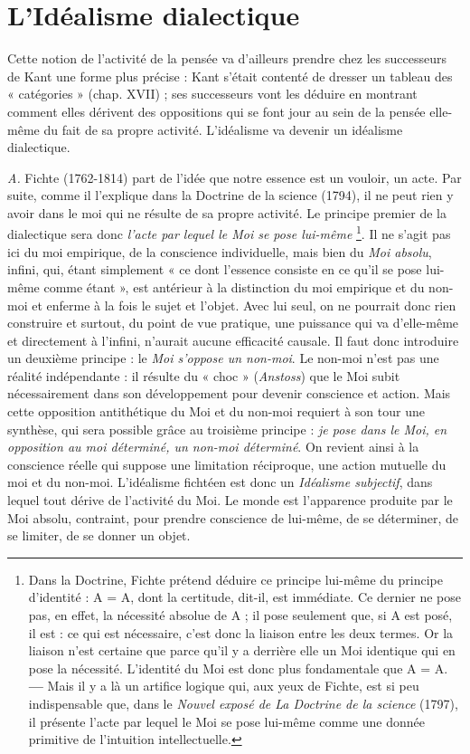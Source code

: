 \section{L'Idéalisme dialectique}%
Cette notion de l’activité
de la pensée va d’ailleurs prendre chez les successeurs de Kant une
forme plus précise : Kant s’était contenté de dresser un tableau des
« catégories » (chap. XVII) ; ses successeurs vont les déduire en montrant
comment elles dérivent des oppositions qui se font jour au sein de
la pensée elle-même du fait de sa propre activité. L’idéalisme va devenir
un idéalisme dialectique.

{\it A.} Fichte (1762-1814) part de l’idée que notre essence est un vouloir,
un acte. Par suite, comme il l'explique dans la Doctrine de la science (1794),
il ne peut rien y avoir dans le moi qui ne résulte de sa propre activité. Le
principe premier de la dialectique sera donc {\it l'acte par lequel le Moi se pose
lui-même}
%
\footnote{Dans la Doctrine, Fichte prétend déduire ce principe lui-même du principe d'identité :
A = A, dont la certitude, dit-il, est immédiate. Ce dernier ne pose pas, en effet,
la nécessité absolue de A ; il pose seulement que, si A est posé, il est : ce qui est nécessaire,
c'est donc la liaison entre les deux termes. Or la liaison n’est certaine que parce qu'il y a
derrière elle un Moi identique qui en pose la nécessité. L'identité du Moi est donc plus
fondamentale que A = A. {\bf —} Mais il y a là un artifice logique qui, aux yeux de Fichte,
est si peu indispensable que, dans le {\it Nouvel exposé de La Doctrine de la science} (1797),
il présente l'acte par lequel le Moi se pose lui-même comme une donnée primitive de
l'intuition intellectuelle.}.
%
Il ne s’agit pas ici du moi empirique, de la conscience individuelle,
mais bien du \textsf{\textit {Moi absolu}}, infini, qui, étant simplement « ce dont l'essence
consiste en ce qu'il se pose lui-même comme étant », est antérieur à la distinction
du moi empirique et du non-moi et enferme à la fois le sujet et l’objet.
Avec lui seul, on ne pourrait donc rien construire et surtout, du point de
vue pratique, une puissance qui va d'elle-même et directement à l'infini,
n'aurait aucune efficacité causale. Il faut donc introduire un deuxième
principe : le {\it Moi s'oppose un non-moi}. Le non-moi n’est pas une réalité indépendante :
il résulte du « choc » ({\it Anstoss}) que le Moi subit nécessairement
dans son développement pour devenir conscience et action. Mais cette
opposition antithétique du Moi et du non-moi requiert à son tour une
synthèse, qui sera possible grâce au troisième principe : {\it je pose dans le
Moi, en opposition au moi déterminé, un non-moi déterminé}. On revient ainsi
à la conscience réelle qui suppose une limitation réciproque, une action
mutuelle du moi et du non-moi. L’idéalisme fichtéen est donc un \textsf{\textit {Idéalisme
subjectif}}, dans lequel tout dérive de l’activité du Moi. Le monde est l’apparence
produite par le Moi absolu, contraint, pour prendre conscience de
lui-même, de se déterminer, de se limiter, de se donner un objet.

